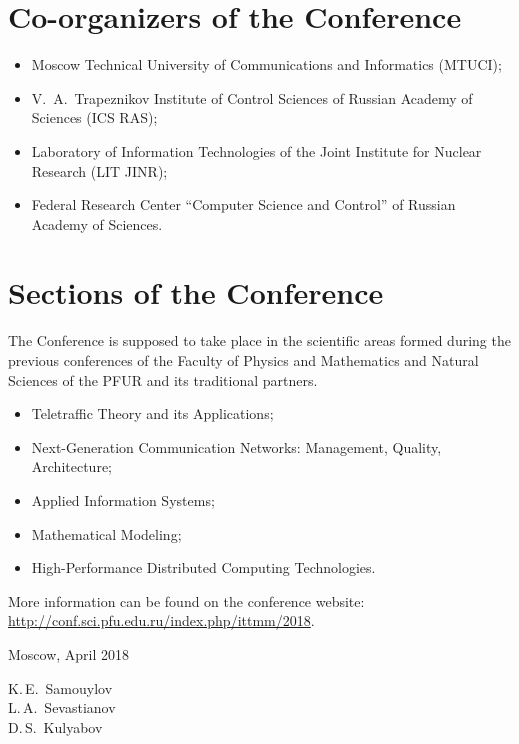 \section*{Co-organizers of the Conference}

\begin{itemize}
\item Moscow Technical University of Communications and Informatics
  (MTUCI);
\item V.~A.~Trapeznikov Institute of Control Sciences of Russian
  Academy of Sciences (ICS RAS);
\item Laboratory of Information Technologies of the Joint Institute
  for Nuclear Research (LIT JINR);
\item Federal Research Center ``Computer Science and Control'' of
  Russian Academy of Sciences.
\end{itemize}

\section*{Sections of the Conference}

The Conference is supposed to take place in the scientific areas
formed during the previous conferences of the Faculty of Physics and
Mathematics and Natural Sciences of the PFUR and its traditional
partners.

\begin{itemize}
\item Teletraffic Theory and its Applications;
\item Next-Generation Communication Networks: Management, Quality,
  Architecture;
\item Applied Information Systems;
\item Mathematical Modeling;
\item High-Performance Distributed Computing Technologies.  
\end{itemize}


More information can be found on the conference website:
\url{http://conf.sci.pfu.edu.ru/index.php/ittmm/2018}.

\bigskip
\bigskip

\noindent
\begin{minipage}[t]{0.45\linewidth}
  \noindent
  Moscow, April 2018
\end{minipage}
\hfill
\begin{minipage}[t]{0.45\linewidth}
  \begin{flushright}
    K.\,E.~Samouylov\\
    L.\,A.~Sevastianov\\
    D.\,S.~Kulyabov
  \end{flushright}
\end{minipage}
